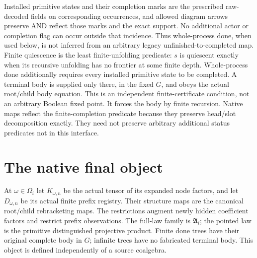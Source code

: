 \documentclass[11pt]{article}
\begin{document}
Installed primitive states and their completion marks are the prescribed raw-decoded fields on corresponding occurrences, and allowed diagram arrows preserve AND reflect those marks and the exact support. No additional actor or completion flag can occur outside that incidence. Thus whole-process done, when used below, is not inferred from an arbitrary legacy unfinished-to-completed map. Finite quiescence is the least finite-unfolding predicate: $s$ is quiescent exactly when its recursive unfolding has no frontier at some finite depth. Whole-process done additionally requires every installed primitive state to be completed. A terminal body is supplied only there, in the fixed $G$, and obeys the actual root/child body equation. This is an independent finite-certificate condition, not an arbitrary Boolean fixed point. It forces the body by finite recursion. Native maps reflect the finite-completion predicate because they preserve head/slot decomposition exactly. They need not preserve arbitrary additional status predicates not in this interface.

\section{The native final object}
At $\omega\in\Omega_i$ let $K_{\omega,n}$ be the actual tensor of its expanded node factors, and let $D_{\omega,n}$ be its actual finite prefix registry. Their structure maps are the canonical root/child rebracketing maps. The restrictions augment newly hidden coefficient factors and restrict prefix observations. The full-law family is $\mathfrak A_i$; the pointed law is the primitive distinguished projective product. Finite done trees have their original complete body in $G$; infinite trees have no fabricated terminal body. This object is defined independently of a source coalgebra.
\end{document}
